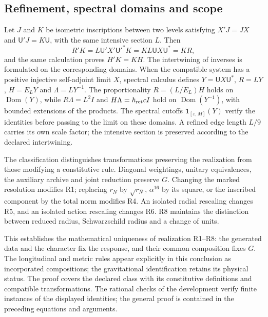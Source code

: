 \subsection{Refinement, spectral domains and scope}

Let \(J\) and \(K\) be isometric inscriptions between two levels
satisfying \(X'J=JX\) and \(\mathsf U'J=K\mathsf U\),
with the same intensive section \(L\). Then
\[
 R'K=L\mathsf U'X'\mathsf U'^*K
     =KL\mathsf U X\mathsf U^*=KR,
\]
and the same calculation proves \(H'K=KH\). The intertwining of
inverses is formulated on the corresponding domains. When the
compatible system has a positive injective self-adjoint limit
\(X\), spectral calculus defines \(Y=\mathsf U X\mathsf U^*\),
\(R=LY\), \(H=E_{L}Y\) and \(\Lambda=LY^{-1}\).
The proportionality \(R=(L/E_{L})H\) holds on
\(\operatorname{Dom}(Y)\), while \(R\Lambda=L^2I\) and
\(H\Lambda=\hbar_{\rm ret}cI\) hold on
\(\operatorname{Dom}(Y^{-1})\), with bounded extensions of the
products. The spectral cutoffs
\(\mathbf1_{[\varepsilon,M]}(Y)\) verify the identities before
passing to the limit on these domains. A refined edge length
\(L/9\) carries its own scale factor; the intensive section is
preserved according to the declared intertwining.

The classification distinguishes transformations preserving the
realization from those modifying a constitutive rule. Diagonal
weightings, unitary equivalences, the auxiliary archive and joint
reduction preserve \(G\). Changing the marked resolution modifies
R1; replacing \(r_N\) by \(\sqrt{r_N}\),
\(\alpha^{16}\) by its square, or the inscribed component by the
total norm modifies R4. An isolated radial rescaling changes R5,
and an isolated action rescaling changes R6. R8 maintains the
distinction between reduced radius, Schwarzschild radius and a
change of units.

This establishes the mathematical uniqueness of realization R1--R8:
the generated data and the character fix the response, and their
common composition fixes \(G\). The longitudinal and metric rules
appear explicitly in this conclusion as incorporated compositions;
the gravitational identification retains its physical status. The
proof covers the declared class with its constitutive definitions
and compatible transformations. The rational checks of the
development verify finite instances of the displayed identities;
the general proof is contained in the preceding equations and
arguments.
